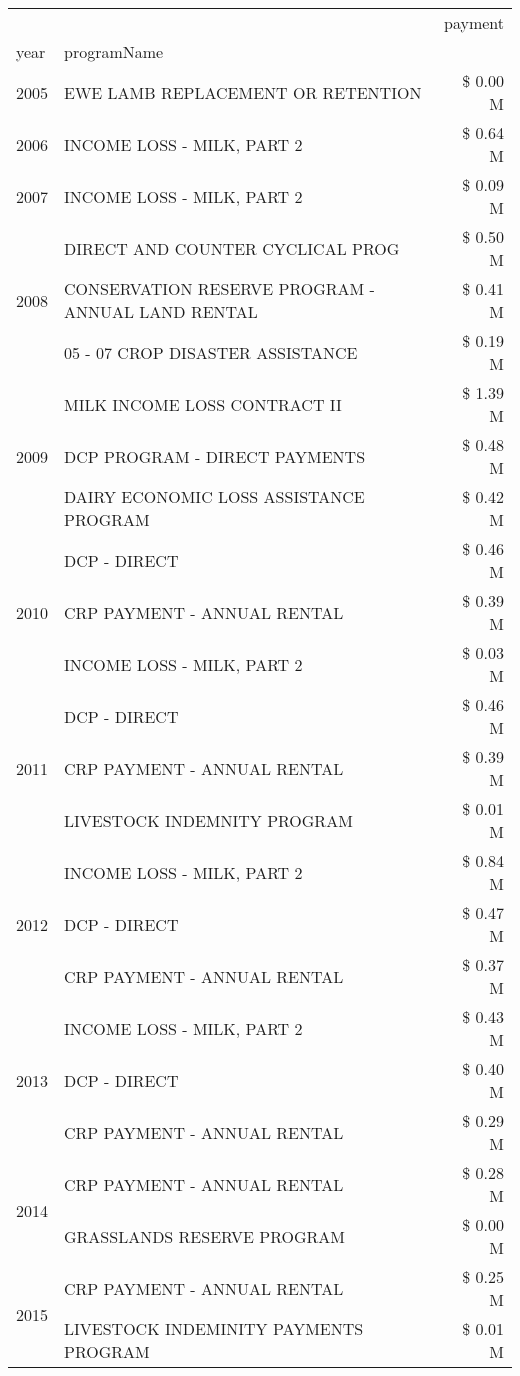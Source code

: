 \begin{tabular}{llr}
\toprule
 &  & payment \\
year & programName &  \\
\midrule
2005 & EWE LAMB REPLACEMENT OR RETENTION & \$ 0.00 M \\
\cline{1-3}
2006 & INCOME LOSS - MILK, PART 2 & \$ 0.64 M \\
\cline{1-3}
2007 & INCOME LOSS - MILK, PART 2 & \$ 0.09 M \\
\cline{1-3}
\multirow[t]{3}{*}{2008} & DIRECT AND COUNTER CYCLICAL PROG & \$ 0.50 M \\
 & CONSERVATION RESERVE PROGRAM - ANNUAL LAND RENTAL & \$ 0.41 M \\
 & 05 - 07 CROP DISASTER ASSISTANCE & \$ 0.19 M \\
\cline{1-3}
\multirow[t]{3}{*}{2009} & MILK INCOME LOSS CONTRACT II & \$ 1.39 M \\
 & DCP PROGRAM - DIRECT PAYMENTS & \$ 0.48 M \\
 & DAIRY ECONOMIC LOSS ASSISTANCE PROGRAM & \$ 0.42 M \\
\cline{1-3}
\multirow[t]{3}{*}{2010} & DCP - DIRECT & \$ 0.46 M \\
 & CRP PAYMENT - ANNUAL RENTAL & \$ 0.39 M \\
 & INCOME LOSS - MILK, PART 2 & \$ 0.03 M \\
\cline{1-3}
\multirow[t]{3}{*}{2011} & DCP - DIRECT & \$ 0.46 M \\
 & CRP PAYMENT - ANNUAL RENTAL & \$ 0.39 M \\
 & LIVESTOCK INDEMNITY PROGRAM & \$ 0.01 M \\
\cline{1-3}
\multirow[t]{3}{*}{2012} & INCOME LOSS - MILK, PART 2 & \$ 0.84 M \\
 & DCP - DIRECT & \$ 0.47 M \\
 & CRP PAYMENT - ANNUAL RENTAL & \$ 0.37 M \\
\cline{1-3}
\multirow[t]{3}{*}{2013} & INCOME LOSS - MILK, PART 2 & \$ 0.43 M \\
 & DCP - DIRECT & \$ 0.40 M \\
 & CRP PAYMENT - ANNUAL RENTAL & \$ 0.29 M \\
\cline{1-3}
\multirow[t]{2}{*}{2014} & CRP PAYMENT - ANNUAL RENTAL & \$ 0.28 M \\
 & GRASSLANDS RESERVE PROGRAM & \$ 0.00 M \\
\cline{1-3}
\multirow[t]{3}{*}{2015} & CRP PAYMENT - ANNUAL RENTAL & \$ 0.25 M \\
 & LIVESTOCK INDEMINITY PAYMENTS PROGRAM & \$ 0.01 M \\

\end{tabular}
